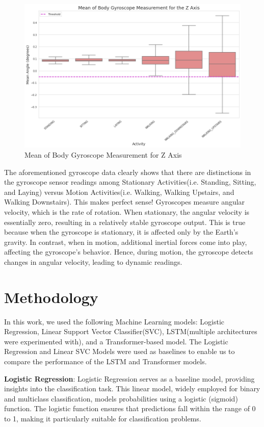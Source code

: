 \documentclass[conference]{IEEEtran}
\begin{document}
\begin{figure}[h!]
	\includegraphics[width= 1.0 \linewidth]{mean_body_gyroscope_z.png}
	\centering
	\caption{Mean of Body Gyroscope Measurement for Z Axis}
	\label{mean_body_gyroscope_z.png}
\end{figure}

The aforementioned gyroscope data clearly shows that there are distinctions in the gyroscope sensor readings among Stationary Activities(i.e. Standing, Sitting, and Laying) versus Motion Activities(i.e. Walking, Walking Upstairs, and Walking Downstairs). This makes perfect sense! Gyroscopes measure angular velocity, which is the rate of rotation. When stationary, the angular velocity is essentially zero, resulting in a relatively stable gyroscope output. This is true because when the gyroscope is stationary, it is affected only by the Earth's gravity. In contrast, when in motion, additional inertial forces come into play, affecting the gyroscope's behavior. Hence, during motion, the gyroscope detects changes in angular velocity, leading to dynamic readings.


\section{Methodology}
In this work, we used the following Machine Learning models: Logistic Regression, Linear Support Vector Classifier(SVC), LSTM(multiple architectures were experimented with), and a Transformer-based model. The Logistic Regression and Linear SVC Models were used as baselines to enable us to compare the performance of the LSTM and Transformer models. \newline 

\textbf{Logistic Regression}: 
Logistic Regression serves as a baseline model, providing insights into the classification task. This linear model, widely employed for binary and multiclass classification, models probabilities using a logistic (sigmoid) function. The logistic function ensures that predictions fall within the range of 0 to 1, making it particularly suitable for classification problems.
\end{document}
